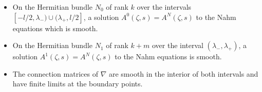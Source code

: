 \documentclass[12pt]{article}
\theoremstyle{definition}
\theoremstyle{remark}
\numberwithin{theorem}{section}
\begin{document}

 \begin{itemize}
\item 
On the Hermitian bundle $N_0$ of rank $k$ over the intervals $[-l/2,  \lambda_-)\cup (\lambda_+, l/2]$, a solution $A^0(\zeta,s)=A^N(\zeta,s)$ to the Nahm equations which  is smooth.
\item 
On the Hermitian bundle $N_1$ of rank $k+m$ over the interval
$(\lambda_-, \lambda_+)$, a solution $A^1(\zeta,s)=A^N(\zeta,s)$ to the Nahm equations is smooth.%
\item 
The connection matrices of $\nabla$ are smooth in the interior of both intervals and  have finite limits at the boundary points.
\end{itemize}
\bigskip

\medskip
\end{document}

